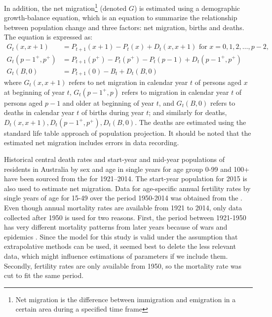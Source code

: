 \documentclass[11pt,a4paper,]{article}
\begin{document}
In addition, the net migration\footnote{Net migration is the difference between immigration and emigration in a certain area during a specified time frame} (denoted \(G\)) is estimated using a demographic growth-balance equation, which is an equation to summarize the relationship between population change and three factors: net migration, births and deaths. The equation is expressed as: 
\vspace{-.3in}
\begin{align*}
  G_t(x,x+1)     & =P_{t+1}(x+1)-P_t(x)+D_t(x,x+1)\text{~for~} x=0,1,2,\dots,p-2,\\
  G_t(p-1^+,p^+) & =P_{t+1}(p^+)-P_t(p^+)-P_t(p-1)+D_t(p-1^+,p^+)\\
  G_t(B,0)       & =P_{t+1}(0)-B_t+D_t(B,0)
\end{align*}
where \(G_t(x,x+1)\) refers to net migration in calendar year \(t\) of persons aged \(x\) at beginning of year \(t\), \(G_t(p-1^+,p)\)  refers to migration in calendar year \(t\) of persons aged \(p-1\) and older at beginning of year \(t\), and \(G_t(B,0)\) refers to deaths in calendar year \(t\) of births during year \(t\); and similarly for deaths, \(D_t(x,x+1), D_t(p-1^+,p^+), D_t(B,0)\). The deaths are estimated using the standard life table approach of population projection. It should be noted that the estimated net migration includes errors in data recording.

Historical central death rates and start-year and mid-year populations of residents in Australia by sex and age in single years for age group 0-99 and 100+ have been sourced from the \textcite{HMD} for 1921--2014. The start-year population for 2015 is also used to estimate net migration. Data for age-specific annual fertility rates by single years of age for 15-49 over the period 1950-2014 was obtained from the \textcite{ABS12}. Even though annual mortality rates are available from 1921 to 2014, only data collected after 1950 is used for two reasons. First, the period between 1921-1950 has very different mortality patterns from later years because of wars and epidemics \autocite{HB08}. Since the model for this study is valid under the assumption that extrapolative methods can be used, it seemed best to delete the less relevant data, which might influence estimations of parameters if we include them. Secondly, fertility rates are only available from 1950, so the mortality rate was cut to fit the same period.
\end{document}
